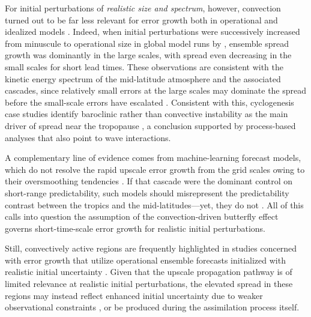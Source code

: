 For initial perturbations of \emph{realistic size and spectrum}, however,
convection turned out to be far less relevant for error growth both in
operational \parencite{lloverasTwoFourdayPredictability2023} and
idealized models \parencite{sunIntrinsicPracticalLimits2016}. Indeed,
when initial perturbations were successively increased from minuscule to
operational size in global model runs by
\textcite{selzTransitionPracticalIntrinsic2022}, ensemble spread growth
was dominantly in the large scales, with spread even decreasing in the
small scales for short lead times. These observations are consistent
with the kinetic energy spectrum of the mid-latitude atmosphere and the
associated cascades, since relatively small errors at the large scales
may dominate the spread before the small-scale errors have escalated
\parencite{rotunnoGeneralizationLorenzsModel2008,
    durranAtmosphericPredictabilityWhy2014}. Consistent with this,
cyclogenesis case studies identify baroclinic rather than convective
instability as the main driver of spread near the tropopause
\parencite{rodwellUncertaintyGrowthForecast2023}, a conclusion supported
by process-based analyses \parencite{baumgartPotentialVorticityDynamics2018,
    baumgartProcessesGoverningAmplification2019} that also point to wave
interactions.

A complementary line of evidence comes from machine-learning forecast
models, which do not resolve the rapid upscale error growth from the
grid scales owing to their oversmoothing tendencies
\parencite{selzCanArtificialIntelligencebased2023,
    liExploringDifferencesAtmospheric2025}. If that cascade were the dominant
control on short-range predictability, such
models should misrepresent the predictability contrast between the tropics and
the
mid-latitudes---yet, they do not \parencite{keaneMidlatitudeTropicalScales2025}.
All of this calls into question the assumption of the convection-driven
butterfly effect governs short-time-scale error growth for realistic
initial perturbations.

Still, convectively active regions are frequently highlighted in studies
concerned with error growth that utilize operational
ensemble forecasts initialized with realistic initial uncertainty
\parencite{sanchezLinkingRapidForecast2020,
    puhFlowDependenceForecast2024, lilloInvestigatingDynamicsError2017,
    magnussonTropicalCycloneActivities2021}. Given
that the upscale propagation pathway is of limited relevance at realistic
initial perturbations, the elevated spread in these regions may instead
reflect enhanced initial uncertainty due to weaker observational
constraints \parencite{rodwellCharacteristicsOccasionalPoor2013}, or be
produced during the assimilation process itself.

